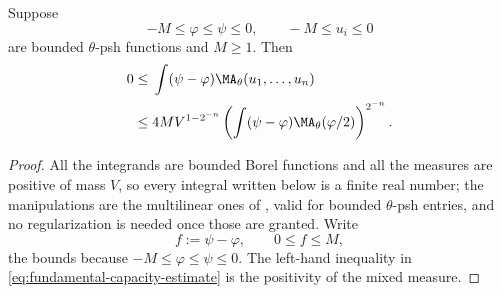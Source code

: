\begin{lemma}
\label{lem:fundamental-capacity-estimate}
Suppose
\[
 -M\leq\varphi\leq\psi\leq0,\qquad
 -M\leq u_i\leq0
\]
are bounded \(\theta\)-psh functions and \(M\geq1\). Then
\begin{equation}
\label{eq:fundamental-capacity-estimate}
\begin{split}
 0\leq{}&\int(\psi-\varphi)
       \MA_\theta(u_1,\ldots,u_n)\\
 \leq{}&4M V^{1-2^{-n}}
 \left(\int(\psi-\varphi)
       \MA_\theta(\varphi/2)\right)^{2^{-n}}.
\end{split}
\end{equation}
\end{lemma}

\begin{proof}
All the integrands are bounded Borel functions and all the measures are
positive of mass \(V\), so every integral written below is a finite real
number; the manipulations are the multilinear ones of
, valid for bounded \(\theta\)-psh
entries, and no regularization is needed once those are granted.  Write
\[
 f:=\psi-\varphi,\qquad 0\leq f\leq M ,
\]
the bounds because \(-M\leq\varphi\leq\psi\leq0\).  The left-hand inequality
in \eqref{eq:fundamental-capacity-estimate} is the positivity of the mixed
measure.


\end{proof}

